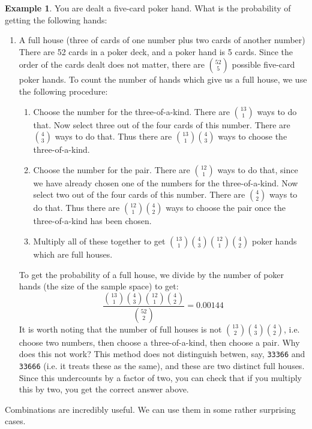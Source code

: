\documentclass[12pt]{article}
\theoremstyle{definition}
\newtheorem*{example}{Example}
\theoremstyle{remark}
\begin{document}
\begin{example}
You are dealt a five-card poker hand. What is the probability of getting the following hands:
\begin{enumerate}
\item A full house (three of cards of one number plus two cards of another number)\\

There are 52 cards in a poker deck, and a poker hand is 5 cards. Since the order of the cards dealt does not matter, there are $\binom{52}{5}$ possible five-card poker hands. To count the number of hands which give us a full house, we use the following procedure:
\begin{enumerate}
\item Choose the number for the three-of-a-kind. There are $\binom{13}{1}$ ways to do that. Now select three out of the four cards of this number. There are $\binom{4}{3}$ ways to do that. Thus there are $\binom{13}{1}\binom{4}{3}$ ways to choose the three-of-a-kind.
\item Choose the number for the pair. There are $\binom{12}{1}$ ways to do that, since we have already chosen one of the numbers for the three-of-a-kind. Now select two out of the four cards of this number. There are $\binom{4}{2}$ ways to do that. Thus there are $\binom{12}{1}\binom{4}{2}$ ways to choose the pair once the three-of-a-kind has been chosen.
\item Multiply all of these together to get $\binom{13}{1}\binom{4}{3}\binom{12}{1}\binom{4}{2}$ poker hands which are full houses.
\end{enumerate}
To get the probability of a full house, we divide by the number of poker hands (the size of the sample space) to get:
\[
\frac{\binom{13}{1}\binom{4}{3}\binom{12}{1}\binom{4}{2}}{\binom{52}{2}} = 0.00144
\]
It is worth noting that the number of full houses is not $\binom{13}{2}\binom{4}{3}\binom{4}{2}$, i.e. choose two numbers, then choose a three-of-a-kind, then choose a pair. Why does this not work? This method does not distinguish betwen, say, \texttt{33366} and \texttt{33666} (i.e. it treats these as the same), and these are two distinct full houses. Since this undercounts by a factor of two, you can check that if you multiply this by two, you get the correct answer above. 
\end{enumerate}
\end{example}

Combinations are incredibly useful. We can use them in some rather surprising cases.
\end{document}

